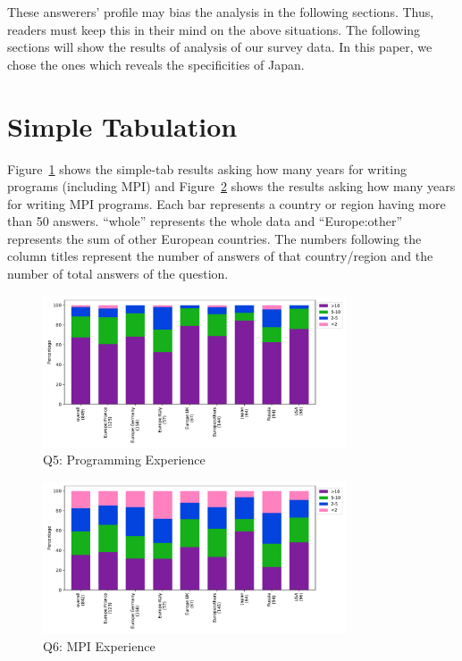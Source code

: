 \documentclass[submit,techrep,noauthor,english]{ipsj}
\begin{document}
These answerers' profile may bias the analysis in the 
following sections. Thus, readers must keep this in their mind on the
above situations.
The following sections will show the results of analysis of our survey
data. In this paper, we chose the ones which reveals the specificities
of Japan. 

\section{Simple Tabulation}\label{sec:simple-tab}

Figure~\ref{fig:q5} shows the simple-tab results asking how many years
for writing programs (including MPI) and Figure~\ref{fig:q6} shows the
results asking how many years for writing MPI programs. Each bar
represents a country or region having more than 50 answers. ``whole''
represents the whole data and ``Europe:other'' represents the sum of
other European countries. The numbers
following the column titles represent the number of answers of that
country/region and the number of total answers of the question.

\begin{figure}[htb]
\begin{center}
  \includegraphics[width=9cm]{../pdfs/Q5.pdf}
  \vspace{-8mm}
\caption{Q5: Programming Experience}
\label{fig:q5}
\end{center}
\end{figure}

\begin{figure}[htb]
\begin{center}
\includegraphics[width=9cm]{../pdfs/Q6.pdf}
  \vspace{-8mm}
\caption{Q6: MPI Experience}
\label{fig:q6}
\end{center}
\end{figure}
\end{document}
